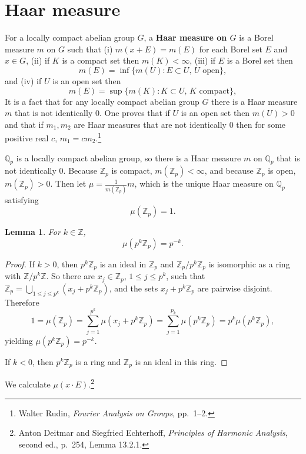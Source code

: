 \documentclass{article}
\newtheorem{lemma}[theorem]{Lemma}
\theoremstyle{definition}
\begin{document}
\section{Haar measure}
For a locally compact abelian group $G$, a \textbf{Haar measure on $G$} is a Borel measure $m$ on $G$ such that (i)
$m(x+E)=m(E)$ for each Borel set $E$ and $x \in G$, (ii) if $K$ is a compact set then $m(K)<\infty$, (iii) if $E$ is a Borel set then
\[
m(E) = \inf\{m(U): \textrm{$E \subset U$, $U$ open}\},
\]
and (iv) if $U$ is an open set then
\[
m(E) = \sup\{m(K): \textrm{$K \subset U$, $K$ compact}\},
\]
It is a fact that for any locally compact abelian group $G$ there is a Haar measure $m$ that is not identically $0$. One proves
that if $U$ is an open set then $m(U)>0$ and that if $m_1,m_2$ are Haar measures that are not identically $0$ then for some
positive real $c$, $m_1=cm_2$.\footnote{Walter Rudin, {\em Fourier Analysis on Groups}, pp.~1--2.}


$\mathbb{Q}_p$ is a locally compact abelian group, so there is a Haar measure $m$ on $\mathbb{Q}_p$ that is not identically $0$. Because $\mathbb{Z}_p$ is compact,
$m(\mathbb{Z}_p)<\infty$, and because $\mathbb{Z}_p$ is open, $m(\mathbb{Z}_p)>0$. Then let
$\mu = \frac{1}{m(\mathbb{Z}_p)} m$, which is the unique Haar measure on $\mathbb{Q}_p$ satisfying
\[
\mu(\mathbb{Z}_p) = 1.
\]


\begin{lemma}
For $k \in \mathbb{Z}$,
\[
\mu(p^k \mathbb{Z}_p) = p^{-k}.
\]
\label{balls}
\end{lemma}
\begin{proof}
If $k>0$, then $p^k \mathbb{Z}_p$ is an ideal in $\mathbb{Z}_p$ and
$\mathbb{Z}_p / p^k \mathbb{Z}_p$ is isomorphic as a ring with 
$\mathbb{Z} / p^k \mathbb{Z}$. So there are 
$x_j \in \mathbb{Z}_p$, $1 \leq j \leq p^k$, such that 
$\mathbb{Z}_p = \bigcup_{1 \leq j \leq p^k} (x_j+p^k \mathbb{Z}_p)$, and
the sets $x_j + p^k \mathbb{Z}_p$ are pairwise disjoint. Therefore
\[
1=\mu(\mathbb{Z}_p) = \sum_{j=1}^{p^k} \mu(x_j+p^k \mathbb{Z}_p) = \sum_{j=1}^{p_k} \mu(p^k\mathbb{Z}_p)
=p^k \mu(p^k \mathbb{Z}_p),
\]
yielding $\mu(p^k \mathbb{Z}_p) = p^{-k}$.

If $k<0$, then $p^k \mathbb{Z}_p$ is a ring and $\mathbb{Z}_p$ is an ideal in this ring. 
\end{proof}

We calculate $\mu(x \cdot E)$.\footnote{Anton Deitmar and Siegfried Echterhoff,
{\em Principles of Harmonic Analysis}, second ed., p.~254, Lemma 13.2.1.}
\end{document}
